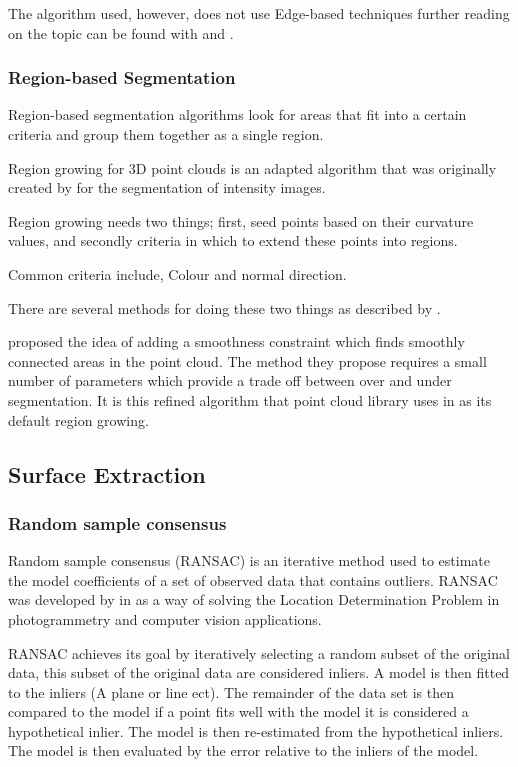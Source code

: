 		The algorithm used, however, does not use Edge-based techniques further reading on the topic can be found with \cite{sappa_fast_2001} and \cite{bhanu_automatic_1986}.
		
		
		\subsubsection{Region-based Segmentation}
		Region-based segmentation algorithms look for areas that fit into a certain criteria and group them together as a single region.
		
		Region growing for 3D point clouds is an adapted algorithm that was originally created by \cite{adams_seeded_1994} for the segmentation of intensity images.
		
		Region growing needs two things; first, seed points based on their curvature values, and secondly criteria in which to extend these points into regions.
		
		Common criteria include, Colour and normal direction.
		
		There are several methods for doing these two things as described by \cite{hoover_experimental_1996}.		
		
		\cite{rabbani_segmentation_2006} proposed the idea of adding a smoothness constraint which finds smoothly connected areas in the point cloud. The method they propose requires a small number of parameters which provide a trade off between over and under segmentation. It is this refined algorithm that point cloud library uses in as its default region growing.
		

		
	
	
	\subsection{Surface Extraction}		
	
		\subsubsection{Random sample consensus}
			Random sample consensus (RANSAC) is an iterative method used to estimate the model coefficients of a set of observed data that contains outliers. RANSAC was developed by \citeauthor{fischler_random_1981} in \citeyear{fischler_random_1981} as a way of solving the Location Determination Problem in photogrammetry and computer vision applications.
			
			RANSAC achieves its goal by iteratively selecting a random subset of the original data, this subset of the original data are considered inliers. A model is then fitted to the inliers (A plane or line ect). The remainder of the data set is then compared to the model if a point fits well with the model it is considered a hypothetical inlier. The model is then re-estimated from the hypothetical inliers. The model is then evaluated by the error relative to the inliers of the model.
			

